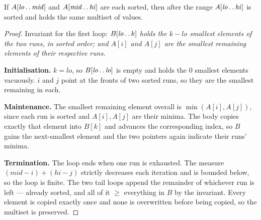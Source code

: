 
\begin{theorem}\label{thm:merge}
If $A[\mathit{lo}\mathinner{\ldotp\ldotp}\mathit{mid}]$ and
$A[\mathit{mid}\mathinner{\ldotp\ldotp}\mathit{hi}]$ are each sorted, then
after  the range
$A[\mathit{lo}\mathinner{\ldotp\ldotp}\mathit{hi}]$ is sorted and holds the
same multiset of values.
\end{theorem}

\begin{proof}
Invariant for the first loop: \emph{$B[\mathit{lo}\mathinner{\ldotp\ldotp}k]$
holds the $k - \mathit{lo}$ smallest elements of the two runs, in sorted order;
and $A[i]$ and $A[j]$ are the smallest remaining elements of their respective
runs.}

\smallskip
\textbf{Initialisation.} $k = \mathit{lo}$, so $B[\mathit{lo}
\mathinner{\ldotp\ldotp}\mathit{lo}]$ is empty and holds the 0 smallest
elements vacuously. $i$ and $j$ point at the fronts of two sorted runs, so they
are the smallest remaining in each.

\smallskip
\textbf{Maintenance.} The smallest remaining element overall is $\min(A[i],
A[j])$, since each run is sorted and $A[i], A[j]$ are their minima. The body
copies exactly that element into $B[k]$ and advances the corresponding index,
so $B$ gains the next-smallest element and the two pointers again indicate
their runs' minima.

\smallskip
\textbf{Termination.} The loop ends when one run is exhausted. The measure
$(\mathit{mid}-i) + (\mathit{hi}-j)$ strictly decreases each iteration and is
bounded below, so the loop is finite. The two tail loops append the remainder
of whichever run is left --- already sorted, and all of it $\ge$ everything in
$B$ by the invariant. Every element is copied exactly once and none is
overwritten before being copied, so the multiset is preserved.
\end{proof}


